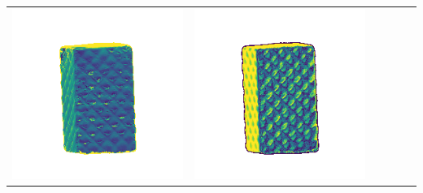\begin{center}
\begin{tabularx}{\linewidth}{@{}Y@{}Y@{}Y@{}Y@{}Y@{}Y@{}}
\includegraphics[width=\linewidth]{semisynthetic/20150514_18_yu_err.png} &
\includegraphics[width=\linewidth]{semisynthetic/20150514_18_dpsn_err.png} &

\end{tabularx}
\end{center}
